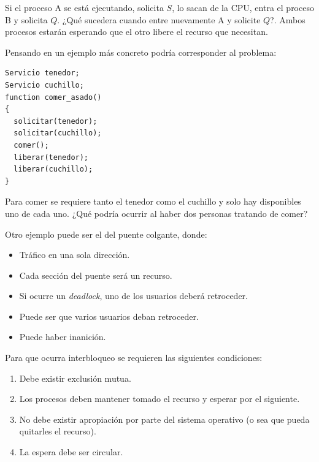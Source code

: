 Si el proceso A se está ejecutando, solicita $S$, lo sacan de la CPU, entra el
proceso B y solicita $Q$. ¿Qué sucedera cuando entre nuevamente A y solicite
$Q$?. Ambos procesos estarán esperando que el otro libere el recurso que
necesitan.

Pensando en un ejemplo más concreto podría corresponder al problema:
\begin{lstlisting}
Servicio tenedor;
Servicio cuchillo;
function comer_asado()
{
  solicitar(tenedor);
  solicitar(cuchillo);
  comer();
  liberar(tenedor);
  liberar(cuchillo);
}
\end{lstlisting}

Para comer se requiere tanto el tenedor como el cuchillo y solo hay disponibles
uno de cada uno. ¿Qué podría ocurrir al haber dos personas tratando de comer?

Otro ejemplo puede ser el del puente colgante, donde:
\begin{itemize}

	\item Tráfico en una sola dirección.

	\item Cada sección del puente será un recurso.

	\item Si ocurre un \textit{deadlock}, uno de los usuarios deberá
	retroceder.

	\item Puede ser que varios usuarios deban retroceder.

	\item Puede haber inanición.

\end{itemize}

Para que ocurra interbloqueo se requieren las siguientes condiciones:
\begin{enumerate}

	\item Debe existir exclusión mutua.

	\item Los procesos deben mantener tomado el recurso y esperar por el
	siguiente.

	\item No debe existir apropiación por parte del sistema operativo
	(o sea que pueda quitarles el recurso).

	\item La espera debe ser circular.

\end{enumerate}


